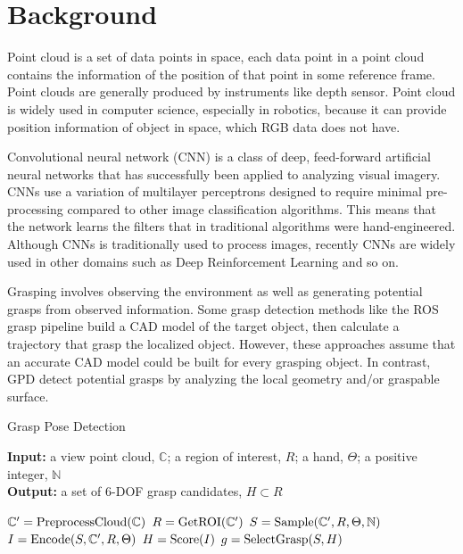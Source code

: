 \documentclass[letterpaper]{article} %
\begin{document}
\section{Background}

Point cloud is a set of data points in space, each data point in a point cloud contains the information of the position of that point in some reference frame. Point clouds are generally produced by instruments like depth sensor. Point cloud is widely used in computer science, especially in robotics, because it can provide position information of object in space, which RGB data does not have. 

Convolutional neural network (CNN) is a class of deep, feed-forward artificial neural networks that has successfully been applied to analyzing visual imagery. CNNs use a variation of multilayer perceptrons designed to require minimal pre-processing compared to other image classification algorithms. This means that the network learns the filters that in traditional algorithms were hand-engineered. Although CNNs is traditionally used to process images, recently CNNs are widely used in other domains such as Deep Reinforcement Learning and so on.

Grasping involves observing the environment as well as generating potential grasps from observed information. Some grasp detection methods like the ROS grasp pipeline \cite{RN5} build a CAD model of the target object, then calculate a trajectory that grasp the localized object. However, these approaches assume that an accurate CAD model could be built for every grasping object. In contrast, GPD \cite{RN6} detect potential grasps by analyzing the local geometry and/or graspable surface.

\begin{algorithm}[H]
\caption{Grasp Pose Detection}
\textbf{Input:} a view point cloud,  $\mathbb{C}$; a region of interest, $R$; a hand, $\Theta$; a positive integer, $\mathbb{N}$ \\
\textbf{Output:} a set of 6-DOF grasp candidates, $H\subset R$ \\
\begin{algorithmic}[1]
\STATE $\mathbb{C}'={\rm PreprocessCloud}(\mathbb{C})$
\STATE $R={\rm GetROI}(\mathbb{C}')$
\STATE $S={\rm Sample}(\mathbb{C}',R,\Theta, \mathbb{N})$
\STATE $I={\rm Encode}(S,\mathbb{C}', R, \Theta)$
\STATE $H={\rm Score}(I)$
\STATE $g={\rm SelectGrasp}(S, H)$
\end{algorithmic}  
\end{algorithm}  
\end{document}
